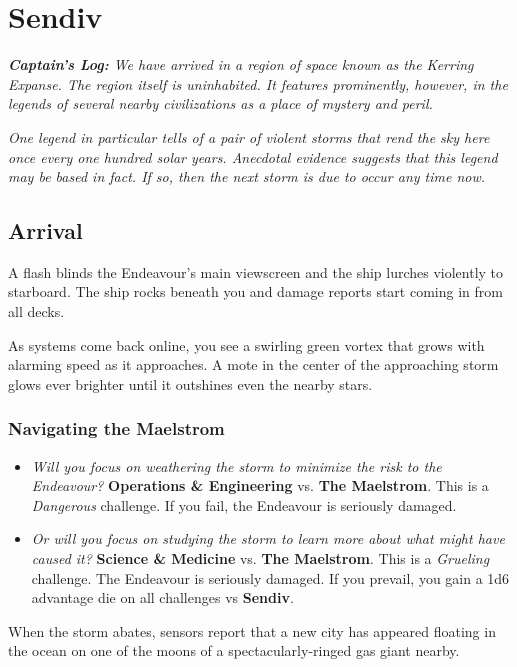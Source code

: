 \documentclass[11pt, a5paper, parskip=half-, DIV=12]{scrartcl}
\begin{document}
\section*{Sendiv}
\textit{\textbf{Captain's Log:} We have arrived in a region of space known as the Kerring Expanse. The region itself is uninhabited. It features prominently, however, in the legends of several nearby civilizations as a place of mystery and peril.}

\textit{One legend in particular tells of a pair of violent storms that rend the sky here once every one hundred solar years.  Anecdotal evidence suggests that this legend may be based in fact.  If so, then the next storm is due to occur any time now.}

\subsection*{Arrival}
A flash blinds the Endeavour's main viewscreen and the ship lurches violently to starboard. The ship rocks beneath you and damage reports start coming in from all decks.

As systems come back online, you see a swirling green vortex that grows with alarming speed as it approaches. A mote in the center of the approaching storm glows ever brighter until it outshines even the nearby stars. 

\subsubsection*{Navigating the Maelstrom}
\begin{itemize}
	\item \textit{Will you focus on weathering the storm to minimize the risk to the Endeavour?} \textbf{Operations \& Engineering} vs. \textbf{The Maelstrom}. This is a \textit{Dangerous} challenge. If you fail, the Endeavour is seriously damaged.
	\item \textit{Or will you focus on studying the storm to learn more about what might have caused it?} \textbf{Science \& Medicine} vs. \textbf{The Maelstrom}. This is a \textit{Grueling} challenge. The Endeavour is seriously damaged. If you prevail, you gain a 1d6 advantage die on all challenges vs \textbf{Sendiv}.
\end{itemize}

When the storm abates, sensors report that a new city has appeared floating in the ocean on one of the moons of a spectacularly-ringed gas giant nearby.
\newpage
\end{document}
